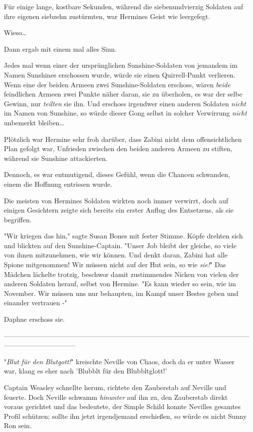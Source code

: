 {Für einige lange, kostbare Sekunden, während die siebenundvierzig Soldaten auf ihre eigenen siebzehn zustürmten, war Hermines Geist wie leergefegt.

Wieso…

Dann ergab mit einem mal alles Sinn.

Jedes mal wenn einer der ursprünglichen Sunshine-Soldaten von jemandem im Namen Sunshines erschossen wurde, würde sie einen Quirrell-Punkt verlieren. Wenn eine der beiden Armeen zwei Sunshine-Soldaten erschoss, wären \emph{beide} feindlichen Armeen zwei Punkte näher daran, sie zu überholen, es war der selbe Gewinn, nur \emph{teilten} sie ihn. Und erschoss irgendwer einen anderen Soldaten \emph{nicht} im Namen von Sunshine, so würde dieser Gong selbst in solcher Verwirrung \emph{nicht} unbemerkt bleiben…

Plötzlich war Hermine sehr froh darüber, dass Zabini nicht dem offensichtlichen Plan gefolgt war, Unfrieden zwischen den beiden anderen Armeen zu stiften, während sie Sunshine attackierten.

Dennoch, es war entmutigend, dieses Gefühl, wenn die Chancen schwanden, einem die Hoffnung entrissen wurde.

Die meisten von Hermines Soldaten wirkten noch immer verwirrt, doch auf einigen Gesichtern zeigte sich bereits ein erster Anflug des Entsetzens, als sie begriffen.

"Wir kriegen das hin," sagte Susan Bones mit fester Stimme. Köpfe drehten sich und blickten auf den Sunshine-Captain. "Unser Job bleibt der gleiche, so viele von ihnen mitzunehmen, wie wir können. Und denkt daran, Zabini hat alle Spione mitgenommen! Wir müssen nicht auf der Hut sein, so wie \emph{sie!}" Das Mädchen lächelte trotzig, beschwor damit zustimmendes Nicken von vielen der anderen Soldaten herauf, selbst von Hermine. "Es kann wieder so sein, wie im November. Wir müssen uns nur behaupten, im Kampf unser Bestes geben und einander vertrauen -"

Daphne erschoss sie.

--------------------------------------------------------------------------------------------------------------------------------------------

"\emph{Blut für den Blutgott!}" kreischte Neville von Chaos, doch da er unter Wasser war, klang es eher nach 'Blubblt für den Blubbltglott!'

Captain Weasley schnellte herum, richtete den Zauberstab auf Neville und feuerte. Doch Neville schwamm \emph{hinunter} auf ihn zu, den Zauberstab direkt voraus gerichtet und das bedeutete, der Simple Schild konnte Nevilles gesamtes Profil schützen; sollte ihn jetzt irgendjemand erschießen, so würde es nicht Sunny Ron sein.

}
